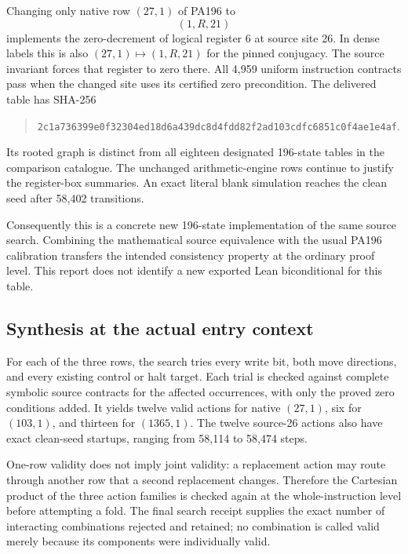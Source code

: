 \documentclass[11pt,a4paper]{article}
\begin{document}
Changing only native row $(27,1)$ of PA196 to
\[
             (1,R,21)
\]
implements the zero-decrement of logical register 6 at source site 26.
In dense labels this is also $(27,1)\mapsto(1,R,21)$ for the pinned
conjugacy. The source invariant forces that register to zero there.
All 4,959 uniform instruction contracts pass when the changed site uses
its certified zero precondition. The delivered table has SHA-256
\begin{quote}\small
\nolinkurl{2c1a736399e0f32304ed18d6a439dc8d4fdd82f2ad103cdfc6851c0f4ae1e4af}.
\end{quote}
Its rooted graph is distinct from all eighteen designated 196-state
tables in the comparison catalogue. The unchanged arithmetic-engine rows
continue to justify the register-box summaries. An exact literal blank
simulation reaches the clean seed after 58,402 transitions.

Consequently this is a concrete new 196-state implementation of the same
source search. Combining the mathematical source equivalence with the
usual PA196 calibration transfers the intended consistency property at
the ordinary proof level. This report does not identify a new exported
Lean biconditional for this table.

\subsection{Synthesis at the actual entry context}

For each of the three rows, the search tries every write bit, both move
directions, and every existing control or halt target. Each trial is
checked against complete symbolic source contracts for the affected
occurrences, with only the proved zero conditions added. It yields twelve
valid actions for native $(27,1)$, six for $(103,1)$, and thirteen for
$(1365,1)$. The twelve source-26 actions also have exact clean-seed
startups, ranging from 58,114 to 58,474 steps.

One-row validity does not imply joint validity: a replacement action may
route through another row that a second replacement changes. Therefore
the Cartesian product of the three action families is checked again at
the whole-instruction level before attempting a fold. The final search
receipt supplies the exact number of interacting combinations rejected
and retained; no combination is called valid merely because its components
were individually valid.


\end{document}

